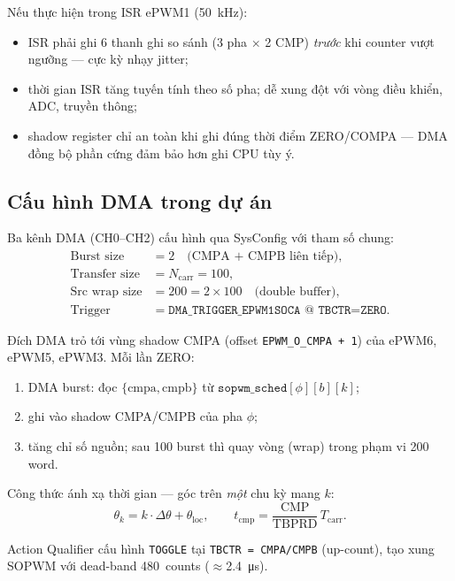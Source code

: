 \documentclass[12pt,a4paper]{article}
\begin{document}
Nếu thực hiện trong ISR ePWM1 (\SI{50}{\kilo\hertz}):
\begin{itemize}[noitemsep]
  \item ISR phải ghi 6 thanh ghi so sánh (3 pha $\times$ 2 CMP) \emph{trước} khi counter vượt ngưỡng --- cực kỳ nhạy jitter;
  \item thời gian ISR tăng tuyến tính theo số pha; dễ xung đột với vòng điều khiển, ADC, truyền thông;
  \item shadow register chỉ an toàn khi ghi đúng thời điểm ZERO/COMPA --- DMA đồng bộ phần cứng đảm bảo hơn ghi CPU tùy ý.
\end{itemize}

\subsection{Cấu hình DMA trong dự án}

Ba kênh DMA (CH0--CH2) cấu hình qua SysConfig với tham số chung:
\begin{align}
  \text{Burst size} &= 2 \quad \text{(CMPA + CMPB liên tiếp)}, \\
  \text{Transfer size} &= N_{\mathrm{carr}} = 100, \\
  \text{Src wrap size} &= 200 = 2 \times 100 \quad \text{(double buffer)}, \\
  \text{Trigger} &= \texttt{DMA\_TRIGGER\_EPWM1SOCA @ TBCTR=ZERO}.
\end{align}

Đích DMA trỏ tới vùng shadow CMPA (offset \texttt{EPWM\_O\_CMPA + 1}) của ePWM6, ePWM5, ePWM3. Mỗi lần ZERO:
\begin{enumerate}[noitemsep]
  \item DMA burst: đọc $\{\mathrm{cmpa},\mathrm{cmpb}\}$ từ $\texttt{sopwm\_sched}[\phi][b][k]$;
  \item ghi vào shadow CMPA/CMPB của pha $\phi$;
  \item tăng chỉ số nguồn; sau 100 burst thì quay vòng (wrap) trong phạm vi 200 word.
\end{enumerate}

Công thức ánh xạ thời gian --- góc trên \emph{một} chu kỳ mang $k$:
\begin{equation}
  \theta_k = k \cdot \Delta\theta + \theta_{\mathrm{loc}}, \qquad
  t_{\mathrm{cmp}} = \frac{\mathrm{CMP}}{\mathrm{TBPRD}}\,T_{\mathrm{carr}}.
  \label{eq:time_angle}
\end{equation}

Action Qualifier cấu hình \texttt{TOGGLE} tại \texttt{TBCTR = CMPA/CMPB} (up-count), tạo xung SOPWM với dead-band \SI{480}{counts} ($\approx$\SI{2.4}{\micro\second}).
\end{document}

